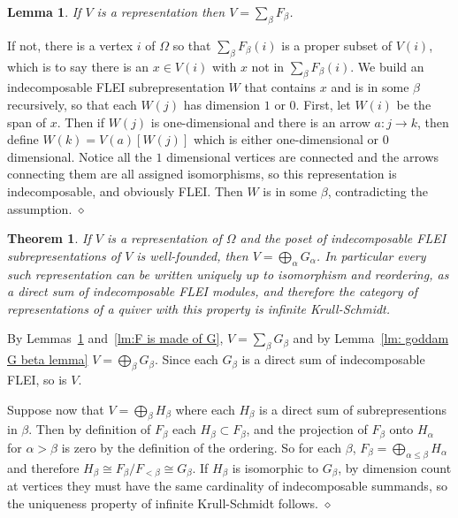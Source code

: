 \documentclass{article}
\newcommand{\maps}{:}
\newtheorem{lemma}{Lemma}[section]
\newtheorem{theorem}{Theorem}
\newenvironment{proof}{\vspace*{2ex}\noindent {\em Proof:}
}{\hfill $\diamond$ \\[2ex]}
\begin{document}
\begin{lemma} \label{lm: V is made of F}
If $V$ is a representation then $V = \sum_\beta F_\beta$.
\end{lemma}

\begin{proof}
  If not, there is a vertex $i$ of $\Omega$ so that $\sum_\beta F_\beta(i)$ is a proper subset of $V(i)$, which is to say there is an $x \in V(i)$ with $x$ not in $\sum_\beta F_\beta(i)$.  We build an indecomposable FLEI subrepresentation $W$ that contains $x$ and is in some $\beta$ recursively, so that each $W(j)$ has dimension $1$ or $0$.  First, let $W(i)$ be the span of $x$.  Then if $W(j)$ is one-dimensional and there is an arrow $a \maps j\to k$, then define $W(k)= V(a)[W(j)]$ which is either one-dimensional or $0$ dimensional.  Notice all the $1$ dimensional vertices are connected and the arrows connecting them are all assigned isomorphisms, so this representation is indecomposable, and obviously FLEI.  Then $W$ is in some $\beta$, contradicting the assumption.
\end{proof}

\begin{theorem}\label{thm: decomp of D infinity reps}
If $V$ is a representation of $\Omega$ and the poset of indecomposable FLEI subrepresentations of $V$ is well-founded,  then $V = \bigoplus_\alpha G_\alpha$. In particular every such representation can be written uniquely up to isomorphism and reordering, as a direct sum of indecomposable FLEI modules, and therefore the category of representations of a quiver with this property is infinite Krull-Schmidt.
\end{theorem}

\begin{proof}
  By Lemmas~\ref{lm: V is made of F} and~\ref{lm:F is made of G}, $V=\sum_\beta G_\beta$ and by Lemma~\ref{lm: goddam G beta lemma} $V = \bigoplus_\beta G_\beta$.  Since each $G_\beta$ is a direct sum of indecomposable FLEI, so is $V$.

  Suppose now that $V= \bigoplus_\beta H_\beta$ where each $H_\beta$ is a direct sum of subrepresentions in $\beta$.  Then by definition of $F_\beta$  each $H_\beta \subset F_\beta$, and the projection of $F_\beta$ onto $H_\alpha$ for $\alpha>\beta$ is zero by the definition of the ordering.  So for each $\beta$, $ F_\beta= \bigoplus_{\alpha \leq \beta} H_\alpha$ and therefore $H_\beta \cong F_\beta/ F_{< \beta} \cong  G_\beta.$  If $H_\beta$ is isomorphic to $G_\beta$, by dimension count at vertices they must have the same cardinality of indecomposable summands, so the uniqueness property of infinite Krull-Schmidt follows.
\end{proof}
\end{document}
